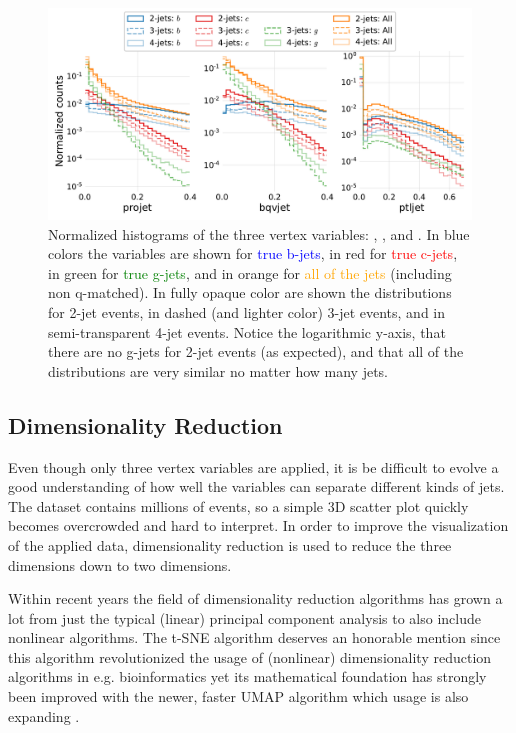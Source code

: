 \begin{figure}[h!]
  \centerfloat
  \includegraphics[width=1\textwidth, trim=10 10 5 5, clip]{figures/quarks/btagging_variables_hist-down_sample=1.00-ML_vars=vertex-selection=b-ejet_min=4-n_iter_RS_lgb=99-n_iter_RS_xgb=9-cdot_cut=0.90-version=19.pdf}
  \caption[Histograms of the Vertex Variables]
          {Normalized histograms of the three vertex variables: , , and . In blue colors the variables are shown for \textcolor{blue}{true b-jets}, in red for \textcolor{red}{true c-jets}, in green for \textcolor{green}{true g-jets}, and in orange for \textcolor{orange}{all of the jets} (including non q-matched). In fully opaque color are shown the distributions for 2-jet events, in dashed (and lighter color) 3-jet events, and in semi-transparent 4-jet events. Notice the logarithmic y-axis, that there are no g-jets for 2-jet events (as expected), and that all of the distributions are very similar no matter how many jets.
          } 
  \label{fig:q:vertex_variables}
\end{figure}

\FloatBarrier
\subsection{Dimensionality Reduction}

Even though only three vertex variables are applied, it is be difficult to evolve a good understanding of how well the variables can separate different kinds of jets. The dataset contains millions of events, so a simple 3D scatter plot quickly becomes overcrowded and hard to interpret. In order to improve the visualization of the applied data, dimensionality reduction is used to reduce the three dimensions down to two dimensions. 

Within recent years the field of dimensionality reduction algorithms has grown a lot from just the typical (linear) principal component analysis to also include nonlinear algorithms. The t-SNE algorithm \autocite{maatenVisualizingDataUsing2008} deserves an honorable mention since this algorithm revolutionized the usage of (nonlinear) dimensionality reduction algorithms in e.g. bioinformatics \citep{toghieshghiQuantitativeComparisonConventional2019, wallachProteinSmallmoleculeDatabase2009}  yet its mathematical foundation has strongly been improved with the newer, faster UMAP algorithm \autocite{mcinnesUMAPUniformManifold2018} which usage is also expanding \citep{bechtEvaluationUMAPAlternative2018, bechtDimensionalityReductionVisualizing2019, diaz-papkovichUMAPRevealsCryptic2019}. 

